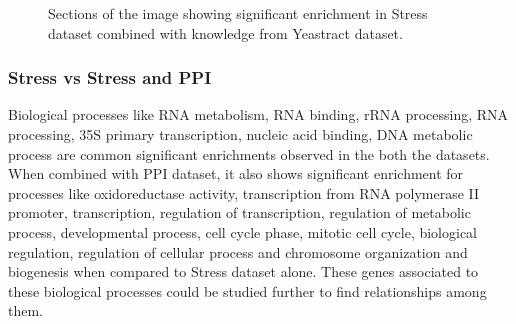 \begin{figure}[p]
\centering
{}
\caption{Sections of the image showing significant enrichment in Stress dataset combined with knowledge from Yeastract dataset. }
\label{fig:stress_yt_enrich}
\end{figure}

\subsubsection{Stress vs Stress and PPI}

Biological processes like RNA metabolism, RNA binding, rRNA processing, RNA processing, 35S primary transcription, nucleic acid binding, DNA metabolic process are common 
significant enrichments observed in the both the datasets. When combined with PPI dataset, it also shows significant enrichment for processes like oxidoreductase activity, 
transcription from RNA polymerase II promoter, transcription, regulation of transcription, regulation of metabolic process, developmental process, cell cycle phase, 
mitotic cell cycle, biological regulation, regulation of cellular process and chromosome organization and biogenesis when compared to Stress dataset alone. These genes associated to these
biological processes could be studied further to find relationships among them.

